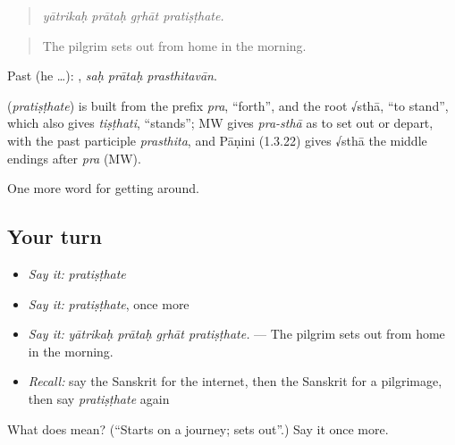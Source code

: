 \begin{quote}
   
\end{quote}

\begin{quote}
\emph{yātrikaḥ prātaḥ gṛhāt pratiṣṭhate.}
\end{quote}

\begin{quote}
The pilgrim sets out from home in the morning.
\end{quote}

Past (he …):   , \emph{saḥ prātaḥ prasthitavān}.

\begin{cousinweb}
\textbf{} (\emph{pratiṣṭhate}) is built from the prefix \emph{pra}, \textquotedblleft{}forth\textquotedblright{}, and the root √sthā, \textquotedblleft{}to stand\textquotedblright{}, which also gives \emph{tiṣṭhati}, \textquotedblleft{}stands\textquotedblright{}; MW gives \emph{pra-sthā} as to set out or depart, with the past participle \emph{prasthita}, and Pāṇini (1.3.22) gives √sthā the middle endings after \emph{pra} (MW).
\end{cousinweb}

\begin{grammarlens}[title={What you've built}]
One more word for getting around.
\end{grammarlens}

\subsection*{Your turn}
\begin{itemize}
\raggedright
  \item \emph{Say it:} \emph{pratiṣṭhate}
  \item \emph{Say it:} \emph{pratiṣṭhate}, once more
  \item \emph{Say it:} \emph{yātrikaḥ prātaḥ gṛhāt pratiṣṭhate.} — The pilgrim sets out from home in the morning.
  \item \emph{Recall:} say the Sanskrit for the internet, then the Sanskrit for a pilgrimage, then say \emph{pratiṣṭhate} again
\end{itemize}

\begin{tcolorbox}[breakable,colback=teal!4,colframe=teal!35!black,title={Before you move on}]
What does  mean? (\textquotedblleft{}Starts on a journey; sets out\textquotedblright{}.) Say it once more.
\end{tcolorbox}
